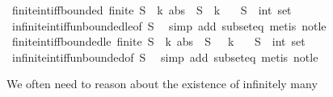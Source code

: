 \begin{isabellebody}
\endisatagproof
{\isafoldproof}%
%
\isadelimproof
\isanewline
%
\endisadelimproof
\isanewline
{}\isamarkupfalse%
\ finite{\isacharunderscore}int{\isacharunderscore}iff{\isacharunderscore}bounded{\isacharcolon}\ {\isachardoublequoteopen}finite\ S\ {\isasymlongleftrightarrow}\ {\isacharparenleft}{\isasymexists}k{\isachardot}\ abs\ {\isacharbackquote}\ S\ {\isasymsubseteq}\ {\isacharbraceleft}{\isachardot}{\isachardot}{\isacharless}k{\isacharbraceright}{\isacharparenright}{\isachardoublequoteclose}\isanewline
\ \ \ S\ {\isacharcolon}{\isacharcolon}\ {\isachardoublequoteopen}int\ set{\isachardoublequoteclose}\isanewline
%
\isadelimproof
\ \ %
\endisadelimproof
%
\isatagproof
{}\isamarkupfalse%
\ infinite{\isacharunderscore}int{\isacharunderscore}iff{\isacharunderscore}unbounded{\isacharunderscore}le{\isacharbrackleft}of\ S{\isacharbrackright}\ \isamarkupfalse%
\ {\isacharparenleft}simp\ add{\isacharcolon}\ subset{\isacharunderscore}eq{\isacharparenright}\ {\isacharparenleft}metis\ not{\isacharunderscore}le{\isacharparenright}%
\endisatagproof
{\isafoldproof}%
%
\isadelimproof
\isanewline
%
\endisadelimproof
\isanewline
{}\isamarkupfalse%
\ finite{\isacharunderscore}int{\isacharunderscore}iff{\isacharunderscore}bounded{\isacharunderscore}le{\isacharcolon}\ {\isachardoublequoteopen}finite\ S\ {\isasymlongleftrightarrow}\ {\isacharparenleft}{\isasymexists}k{\isachardot}\ abs\ {\isacharbackquote}\ S\ {\isasymsubseteq}\ {\isacharbraceleft}{\isachardot}{\isachardot}\ k{\isacharbraceright}{\isacharparenright}{\isachardoublequoteclose}\isanewline
\ \ \ S\ {\isacharcolon}{\isacharcolon}\ {\isachardoublequoteopen}int\ set{\isachardoublequoteclose}\isanewline
%
\isadelimproof
\ \ %
\endisadelimproof
%
\isatagproof
{}\isamarkupfalse%
\ infinite{\isacharunderscore}int{\isacharunderscore}iff{\isacharunderscore}unbounded{\isacharbrackleft}of\ S{\isacharbrackright}\ \isamarkupfalse%
\ {\isacharparenleft}simp\ add{\isacharcolon}\ subset{\isacharunderscore}eq{\isacharparenright}\ {\isacharparenleft}metis\ not{\isacharunderscore}le{\isacharparenright}%
\endisatagproof
{\isafoldproof}%
%
\isadelimproof
%
\endisadelimproof
%
\isadelimdocument
%
\endisadelimdocument
%
\isatagdocument
%
\isamarkuptrue%
%
\endisatagdocument
{\isafolddocument}%
%
\isadelimdocument
%
\endisadelimdocument
%
\begin{isamarkuptext}%
We often need to reason about the existence of infinitely many

\end{isamarkuptext}
\end{isabellebody}
